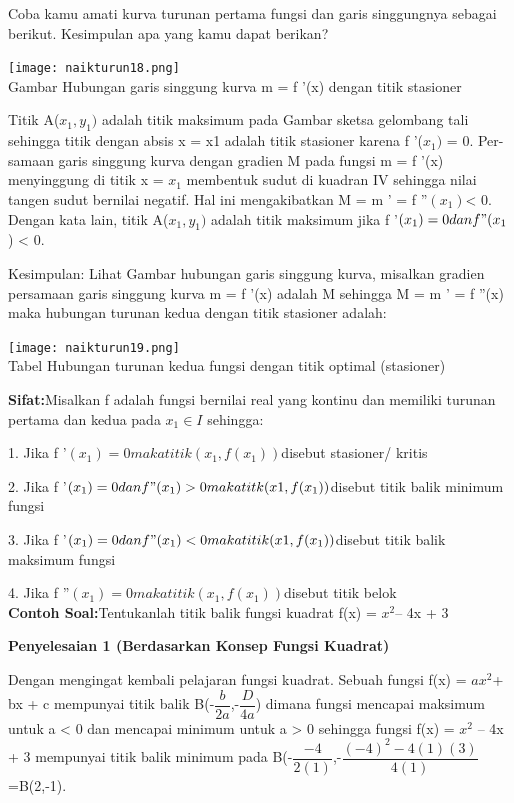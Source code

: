 \documentclass[11pt,fleqn]{book} %
\begin{document}
Coba kamu amati kurva turunan pertama fungsi dan
garis singgungnya sebagai berikut. Kesimpulan apa
yang kamu dapat berikan?

\begin{center}
\texttt{[image: naikturun18.png]}\\
Gambar Hubungan garis singgung kurva m = f '(x)
dengan titik stasioner
\end{center}

Titik A($x_{1}, y_{1})$ adalah titik maksimum pada Gambar sketsa gelombang tali sehingga titik dengan absis x = x1 adalah titik stasioner karena f '($x_{1})$ = 0. Per-samaan garis singgung kurva dengan gradien M pada fungsi m = f '(x) menyinggung di titik x = $x_{1}$ membentuk sudut di kuadran IV sehingga nilai tangen sudut bernilai negatif. Hal ini mengakibatkan M = m ' = f ''$(x_{1}) $< 0. Dengan kata lain, titik A($x_{1}, y_{1})$ adalah titik maksimum jika f '$(x_{1}) = 0 dan f "(x_{1}$) < 0.

Kesimpulan: Lihat Gambar hubungan garis singgung kurva, misalkan gradien persamaan garis singgung kurva m = f '(x) adalah M sehingga M = m ' = f ''(x) maka hubungan turunan kedua dengan titik stasioner adalah:

\begin{center}
\texttt{[image: naikturun19.png]}\\
Tabel Hubungan turunan kedua fungsi dengan
titik optimal (stasioner)
\end{center}

\textbf{Sifat:}Misalkan f adalah fungsi bernilai real yang kontinu
dan memiliki turunan pertama dan kedua pada $x_{1} \in I$
sehingga:

1. Jika f '$(x_{1}) = 0 maka titik (x_{1}, f(x_{1}))$disebut stasioner/
kritis

2. Jika f '$(x_{1}) = 0 dan f "(x_{1}) > 0 maka titk (x1, f(x_{1}))$disebut titik balik minimum fungsi

3. Jika f '$(x_{1}) = 0 dan f "(x_{1}) < 0 maka titik (x1, f(x_{1}))$disebut titik balik maksimum fungsi

4. Jika f ''$(x_{1}) = 0 maka titik (x_{1}, f(x_{1})) $disebut titik belok\\

\textbf{Contoh Soal:}Tentukanlah titik balik fungsi kuadrat f(x) = $x^{2} $– 4x + 3

\textbf{Penyelesaian 1 (Berdasarkan Konsep
Fungsi Kuadrat)}

Dengan mengingat kembali pelajaran fungsi kuadrat.
Sebuah fungsi f(x) = $ax^{2} $+ bx + c mempunyai titik balik B(-$\dfrac{b}{2a}$,-$\dfrac{D}{4a}$) dimana fungsi mencapai maksimum untuk a < 0 dan mencapai minimum untuk a > 0 sehingga fungsi
f(x) = $x^{2}$ – 4x + 3 mempunyai titik balik minimum pada B(-$\dfrac{-4}{2(1)}$,-$\dfrac{(-4)^{2}-4(1)(3)}{4(1)}$=B(2,-1).\\
\end{document}
